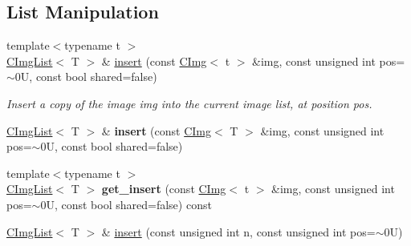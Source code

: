 \subsection*{List Manipulation}
\label{_amgrpd0c99fdbff20276dd1304738a84fd9c3}
 \begin{DoxyCompactItemize}
\item 
\hypertarget{structcimg__library_1_1CImgList_ab95eea37a271a9c3942fd19404203af5}{
{\footnotesize template$<$typename t $>$ }\\\hyperlink{structcimg__library_1_1CImgList}{CImgList}$<$ T $>$ \& \hyperlink{structcimg__library_1_1CImgList_ab95eea37a271a9c3942fd19404203af5}{insert} (const \hyperlink{structcimg__library_1_1CImg}{CImg}$<$ t $>$ \&img, const unsigned int pos=$\sim$0U, const bool shared=false)}
\label{structcimg__library_1_1CImgList_ab95eea37a271a9c3942fd19404203af5}

\begin{DoxyCompactList}\small\item\em Insert a copy of the image {\ttfamily img} into the current image list, at position {\ttfamily pos}. \item\end{DoxyCompactList}\item 
\hypertarget{structcimg__library_1_1CImgList_ace9966cad18c8a2d8c6758a470f1bd89}{
\hyperlink{structcimg__library_1_1CImgList}{CImgList}$<$ T $>$ \& {\bfseries insert} (const \hyperlink{structcimg__library_1_1CImg}{CImg}$<$ T $>$ \&img, const unsigned int pos=$\sim$0U, const bool shared=false)}
\label{structcimg__library_1_1CImgList_ace9966cad18c8a2d8c6758a470f1bd89}

\item 
\hypertarget{structcimg__library_1_1CImgList_ab7715dcaf7ab8d95f2dc6df417a7d6a8}{
{\footnotesize template$<$typename t $>$ }\\\hyperlink{structcimg__library_1_1CImgList}{CImgList}$<$ T $>$ {\bfseries get\_\-insert} (const \hyperlink{structcimg__library_1_1CImg}{CImg}$<$ t $>$ \&img, const unsigned int pos=$\sim$0U, const bool shared=false) const }
\label{structcimg__library_1_1CImgList_ab7715dcaf7ab8d95f2dc6df417a7d6a8}

\item 
\hypertarget{structcimg__library_1_1CImgList_a96931b7ec7843bfc1dceda7ff629f3ee}{
\hyperlink{structcimg__library_1_1CImgList}{CImgList}$<$ T $>$ \& \hyperlink{structcimg__library_1_1CImgList_a96931b7ec7843bfc1dceda7ff629f3ee}{insert} (const unsigned int n, const unsigned int pos=$\sim$0U)}
\label{structcimg__library_1_1CImgList_a96931b7ec7843bfc1dceda7ff629f3ee}


\end{DoxyCompactItemize}

